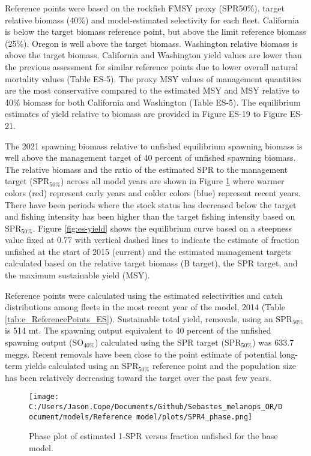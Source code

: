 \documentclass[11pt,
  english,
  letterpaper,
]{article}
\begin{document}
Reference points were based on the rockfish FMSY proxy (SPR50\%), target relative biomass (40\%) and model-estimated selectivity for each fleet. California is below the target biomass reference point, but above the limit reference biomass (25\%). Oregon is well above the target biomass. Washington relative biomass is above the target biomass. California and Washington yield values are lower than the previous assessment for similar reference points due to lower overall natural mortality values (Table ES-5). The proxy MSY values of management quantities are the most conservative compared to the estimated MSY and MSY relative to 40\% biomass for both California and Washington (Table ES-5). The equilibrium estimates of yield relative to biomass are provided in Figure ES-19 to Figure ES-21.

The 2021 spawning biomass relative to unfished equilibrium spawning biomass is well above the management target of 40 percent of unfished spawning biomass. The relative biomass and the ratio of the estimated SPR to the management target (\(\text{SPR}_{50\%}\)) across all model years are shown in Figure \ref{fig:es-phase} where warmer colors (red) represent early years and colder colors (blue) represent recent years. There have been periods where the stock status has decreased below the target and fishing intensity has been higher than the target fishing intensity based on \(\text{SPR}_{50\%}\). Figure \ref{fig:es-yield} shows the equilibrium curve based on a steepness value fixed at 0.77 with vertical dashed lines to indicate the estimate of fraction unfished at the start of 2015 (current) and the estimated management targets calculated based on the relative target biomass (B target), the SPR target, and the maximum sustainable yield (MSY).

Reference points were calculated using the estimated selectivities and catch distributions among fleets in the most recent year of the model, 2014 (Table \ref{tab:e_ReferencePoints_ES}). Sustainable total yield, removals, using an \(\text{SPR}_{50\%}\) is 514 mt. The spawning output equivalent to 40 percent of the unfished spawning output (\(\text{SO}_{40\%}\)) calculated using the SPR target (\(\text{SPR}_{50\%}\)) was 633.7 meggs. Recent removals have been close to the point estimate of potential long-term yields calculated using an \(\text{SPR}_{50\%}\) reference point and the population size has been relatively decreasing toward the target over the past few years.

\begin{figure}
\centering
\texttt{[image: C:/Users/Jason.Cope/Documents/Github/Sebastes\_melanops\_OR/Document/models/Reference model/plots/SPR4\_phase.png]}
\caption{Phase plot of estimated 1-SPR versus fraction unfished for the base model.\label{fig:es-phase}}
\end{figure}
\end{document}
